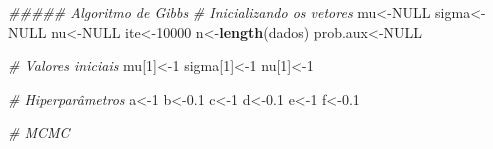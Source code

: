 \documentclass[]{article}
\newenvironment{Shaded}{\begin{snugshade}}{\end{snugshade}}
\newcommand{\CommentTok}[1]{\textcolor[rgb]{0.56,0.35,0.01}{\textit{#1}}}
\newcommand{\DecValTok}[1]{\textcolor[rgb]{0.00,0.00,0.81}{#1}}
\newcommand{\FloatTok}[1]{\textcolor[rgb]{0.00,0.00,0.81}{#1}}
\newcommand{\KeywordTok}[1]{\textcolor[rgb]{0.13,0.29,0.53}{\textbf{#1}}}
\newcommand{\NormalTok}[1]{#1}
\newcommand{\OtherTok}[1]{\textcolor[rgb]{0.56,0.35,0.01}{#1}}
\begin{document}
\begin{Shaded}
\begin{Highlighting}[]
\CommentTok{##### Algoritmo de Gibbs}
\CommentTok{# Inicializando os vetores}
\NormalTok{mu<-}\OtherTok{NULL}
\NormalTok{sigma<-}\OtherTok{NULL}
\NormalTok{nu<-}\OtherTok{NULL}
\NormalTok{ite<-}\DecValTok{10000}
\NormalTok{n<-}\KeywordTok{length}\NormalTok{(dados)}
\NormalTok{prob.aux<-}\OtherTok{NULL}

\CommentTok{# Valores iniciais}
\NormalTok{mu[}\DecValTok{1}\NormalTok{]<-}\DecValTok{1}
\NormalTok{sigma[}\DecValTok{1}\NormalTok{]<-}\DecValTok{1}
\NormalTok{nu[}\DecValTok{1}\NormalTok{]<-}\DecValTok{1}

\CommentTok{# Hiperparâmetros}
\NormalTok{a<-}\DecValTok{1}
\NormalTok{b<-}\FloatTok{0.1}
\NormalTok{c<-}\DecValTok{1}
\NormalTok{d<-}\FloatTok{0.1}  
\NormalTok{e<-}\DecValTok{1}
\NormalTok{f<-}\FloatTok{0.1}

\CommentTok{# MCMC}
\end{Highlighting}
\end{Shaded}
\end{document}
